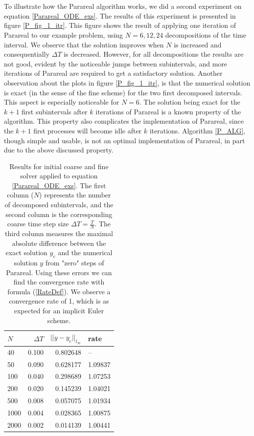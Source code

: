 \\
\\
To illustrate how the Parareal algorithm works, we did a second experiment on equation \ref{Parareal_ODE_exs}. The results of this experiment is presented in figure \ref{P_fig_1_itr}. This figure shows the result of applying one iteration of Parareal to our example problem, using $N=6,12,24$ decompositions of the time interval. We observe that the solution improves when $N$ is increased and consequentially $\Delta T$ is decreased. However, for all decompositions the results are not good, evident by the noticeable jumps between subintervals, and more iterations of Parareal are required to get a satisfactory solution. Another observation about the plots in figure \ref{P_fig_1_itr}, is that the numerical solution is exact (in the sense of the fine scheme) for the two first decomposed intervals. This aspect is especially noticeable for $N=6$. The solution being exact for the $k+1$ first subintervals after $k$ iterations of Parareal is a known property of the algorithm. This property also complicates the implementation of Parareal, since the $k+1$ first processes will become idle after $k$ iterations. Algorithm \ref{P_ALG}, though simple and usable, is not an optimal implementation of Parareal, in part due to the above discussed property.
\\
\begin{table}[h]
\centering
\caption{Results for initial coarse and fine solver applied to equation \ref{Parareal_ODE_exs}. The first column ($N$) represents the number of decomposed subintervals, and the second column is the corresponding coarse time step size $\Delta T=\frac{T}{N}$. The third column measures the maximal absolute difference between the exact solution $y_e$ and the numerical solution $y$ from "zero" steps of Parareal. Using these errors we can find the convergence rate with formula (\ref{RateDef}). We observe a convergence rate of 1, which is as expected for an implicit Euler scheme.}
\label{par_con1}
\begin{tabular}{lrrl}
\toprule
{}$N$ &      $\Delta T$ &       $||y-y_e||_{l_{\infty}}$ &  rate \\
\midrule
40   &  0.100 &  0.802648 &       -- \\
50   &  0.090 &  0.628177 &  1.09837 \\
100  &  0.040 &  0.298689 &  1.07253 \\
200  &  0.020 &  0.145239 &  1.04021 \\
500  &  0.008 &  0.057075 &  1.01934 \\
1000 &  0.004 &  0.028365 &  1.00875 \\
2000 &  0.002 &  0.014139 &  1.00441 \\
\bottomrule
\end{tabular}
\end{table}
